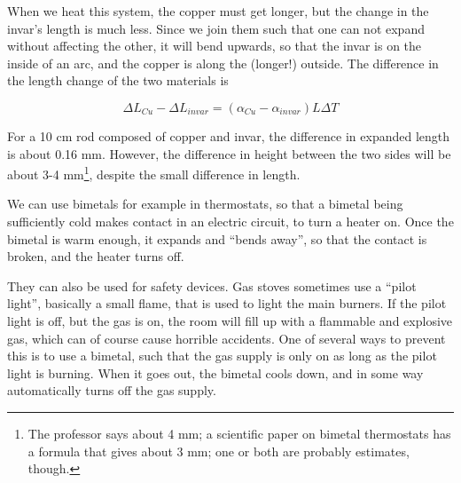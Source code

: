 \begin{figure}[H]
  \centering
{}
\end{figure}



When we heat this system, the copper must get longer, but the change in the invar's length is much less. Since we join them such that one can not expand without affecting the other, it will bend upwards, so that the invar is on the inside of an arc, and the copper is along the (longer!) outside. The difference in the length change of the two materials is

\begin{equation}
\Delta L_{Cu} - \Delta L_{invar} = (\alpha_{Cu} - \alpha_{invar}) L \Delta T
\end{equation}

For a 10 cm rod composed of copper and invar, the difference in expanded length is about 0.16 mm. However, the difference in height between the two sides will be about 3-4 mm\footnote{The professor says about 4 mm; a scientific paper on bimetal thermostats has a formula that gives about 3 mm; one or both are probably estimates, though.}, despite the small difference in length.

We can use bimetals for example in thermostats, so that a bimetal being sufficiently cold makes contact in an electric circuit, to turn a heater on. Once the bimetal is warm enough, it expands and ``bends away'', so that the contact is broken, and the heater turns off.

They can also be used for safety devices. Gas stoves sometimes use a ``pilot light'', basically a small flame, that is used to light the main burners. If the pilot light is off, but the gas is on, the room will fill up with a flammable and explosive gas, which can of course cause horrible accidents. One of several ways to prevent this is to use a bimetal, such that the gas supply is only on as long as the pilot light is burning. When it goes out, the bimetal cools down, and in some way automatically turns off the gas supply.

